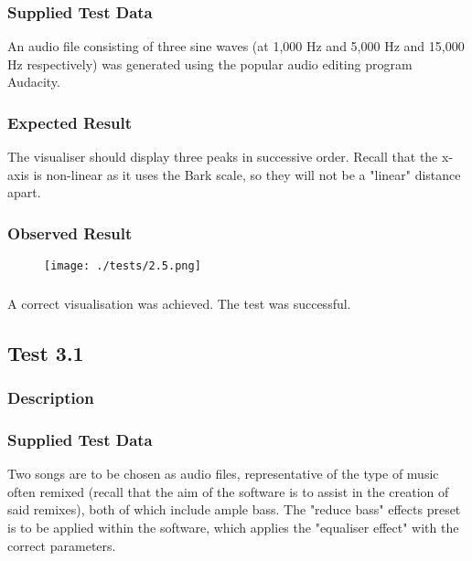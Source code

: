 \subsubsection{Supplied Test Data}
An audio file consisting of three sine waves (at 1,000 Hz and 5,000 Hz and 15,000 Hz respectively) was generated using the popular audio editing program Audacity.

\subsubsection{Expected Result}
The visualiser should display three peaks in successive order. Recall that the x-axis is non-linear as it uses the Bark scale, so they will not be a "linear" distance apart.

\subsubsection{Observed Result}
\label{sec:evidence2.5}
\begin{figure}[H]
	\texttt{[image: ./tests/2.5.png]}
\end{figure}

\subsubsection{}
A correct visualisation was achieved. The test was successful.


\pagebreak
\subsection{Test 3.1}
\subsubsection{Description}
\paragraph{}
{
	\centering
}

\subsubsection{Supplied Test Data}
Two songs are to be chosen as audio files, representative of the type of music often remixed (recall that the aim of the software is to assist in the creation of said remixes), both of which include ample bass. The "reduce bass" effects preset is to be applied within the software, which applies the "equaliser effect" with the correct parameters.

